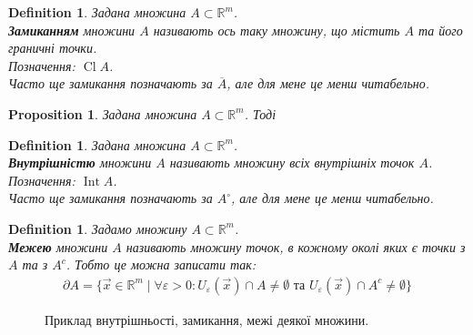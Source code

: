 \documentclass[a4paper, 10pt]{article}
\theoremstyle{theoremdd}
\theoremstyle{theoremdd}
\theoremstyle{theoremdd}
\newtheorem{definition}[theorem]{Definition}
\theoremstyle{theoremdd}
\theoremstyle{theoremdd}
\theoremstyle{theoremdd}
\newtheorem{proposition}[theorem]{Proposition}
\theoremstyle{theoremdd}
\theoremstyle{theoremdd}
\theoremstyle{theoremdd}
\DeclareMathOperator{\Cl}{Cl}
\DeclareMathOperator{\Int}{Int}
\begin{document}
\begin{definition}
Задана множина $A \subset \mathbb{R}^m$.\\
\textbf{Замиканням} множини $A$ називають ось таку множину, що містить $A$ та його граничні точки.\\
Позначення: $\Cl A$.\\
Часто ще замикання позначають за $\overline{A}$, але для мене це менш читабельно.
\end{definition}

\begin{proposition}
Задана множина $A \subset \mathbb{R}^m$. Тоді
\end{proposition}

\begin{definition}
Задана множина $A \subset \mathbb{R}^m$.\\
\textbf{Внутрішністю} множини $A$ називають множину всіх внутрішніх точок $A$.\\
Позначення: $\Int A$.\\
Часто ще замикання позначають за $A^\circ$, але для мене це менш читабельно.
\end{definition}

\begin{definition}
Задамо множину $A \subset \mathbb{R}^m$.\\
\textbf{Межею} множини $A$ називають множину точок, в кожному околі яких є точки з $A$ та з $A^c$. Тобто це можна записати так:
\begin{align*}
\partial A = \{ \vec{x} \in \mathbb{R}^m \mid \forall \varepsilon > 0: U_\varepsilon(\vec{x}) \cap A \neq \emptyset \text{ та } U_\varepsilon(\vec{x}) \cap A^c \neq \emptyset \}
\end{align*}
\end{definition}

\begin{figure}[H]
\centering
{}
\qquad
{}
\qquad
{}
\qquad
{}
\caption*{Приклад внутрішньості, замикання, межі деякої множини.}
\end{figure}
\end{document}
